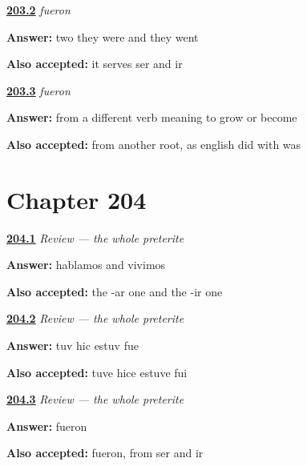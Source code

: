 \noindent\begin{minipage}[t]{\linewidth}
\raggedright
\hyperlink{review-ES-C55-fueron-two}{\textbf{203.2}} \emph{fueron}\par
\small \textbf{Answer:} two they were and they went\par
\footnotesize \textbf{Also accepted:} it serves ser and ir
\end{minipage}\par\medskip

\noindent\begin{minipage}[t]{\linewidth}
\raggedright
\hyperlink{review-ES-C55-fueron-why}{\textbf{203.3}} \emph{fueron}\par
\small \textbf{Answer:} from a different verb meaning to grow or become\par
\footnotesize \textbf{Also accepted:} from another root, as english did with was
\end{minipage}\par\medskip

\section*{Chapter 204}

\noindent\begin{minipage}[t]{\linewidth}
\raggedright
\hyperlink{review-ES-C55-repaso-preterito-both}{\textbf{204.1}} \emph{Review — the whole preterite}\par
\small \textbf{Answer:} hablamos and vivimos\par
\footnotesize \textbf{Also accepted:} the -ar one and the -ir one
\end{minipage}\par\medskip

\noindent\begin{minipage}[t]{\linewidth}
\raggedright
\hyperlink{review-ES-C55-repaso-preterito-strong}{\textbf{204.2}} \emph{Review — the whole preterite}\par
\small \textbf{Answer:} tuv hic estuv fue\par
\footnotesize \textbf{Also accepted:} tuve hice estuve fui
\end{minipage}\par\medskip

\noindent\begin{minipage}[t]{\linewidth}
\raggedright
\hyperlink{review-ES-C55-repaso-preterito-odd}{\textbf{204.3}} \emph{Review — the whole preterite}\par
\small \textbf{Answer:} fueron\par
\footnotesize \textbf{Also accepted:} fueron, from ser and ir
\end{minipage}\par\medskip

